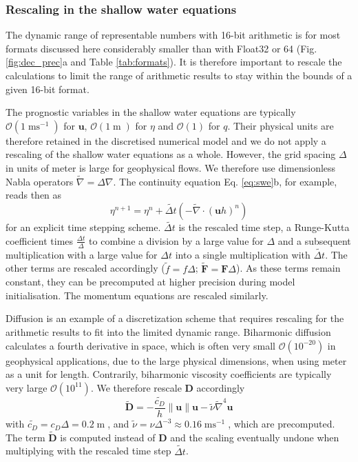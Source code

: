 \documentclass[draft]{agujournal2019}
\newcommand{\op}{\operatorname}
\begin{document}
\subsubsection{Rescaling in the shallow water equations}
\label{sec:swm_rescale}

The dynamic range of representable numbers with 16-bit arithmetic is for most
formats discussed here considerably smaller than with Float32 or 64
(Fig. \ref{fig:dec_prec}a and Table \ref{tab:formats}). It is therefore
important to rescale the calculations to limit the range of
arithmetic results to stay within the bounds of a given 16-bit format.

The prognostic variables in the shallow water equations are typically
$\mathcal{O}(1\op{ms}^{-1})$ for $\mathbf{u}$, $\mathcal{O}(1\op{m})$ for
$\eta$ and $\mathcal{O}(1)$ for $q$. Their physical units are therefore retained
in the discretised numerical model and we do not apply a rescaling of the shallow
water equations as a whole. However, the grid spacing $\Delta$ in units of meter
is large for geophysical flows. We therefore use dimensionless Nabla operators
$\tilde{\nabla} = \Delta\nabla$. The continuity equation Eq. \ref{eq:swe}b,
for example, reads then as
\begin{equation}
\eta^{n+1} = \eta^n + \tilde{\Delta t}\left( - \tilde{\nabla} \cdot (\mathbf{u}h)^n\right)
\label{eq:discr}
\end{equation}
for an explicit time stepping scheme. $\tilde{\Delta t}$ is the rescaled time
step, a Runge-Kutta coefficient times $\tfrac{\Delta t}{\Delta}$ to combine a
division by a large value for $\Delta$ and a subsequent multiplication with a
large value for $\Delta t$ into a single multiplication with $\tilde{\Delta t}$.
The other terms are rescaled accordingly ($\tilde{f} = f\Delta$;
$\tilde{\mathbf{F}} = \mathbf{F}\Delta$). As these terms remain constant, they
can be precomputed at higher precision during model initialisation.
The momentum equations are rescaled similarly.

Diffusion is an example of a discretization scheme that requires rescaling for
the arithmetic results to fit into the limited dynamic range. Biharmonic diffusion
\cite{Griffies2000} calculates a fourth derivative in space,
which is often very small $\mathcal{O}(10^{-20})$ in geophysical applications,
due to the large physical dimensions, when using meter as a unit for length.
Contrarily, biharmonic viscosity coefficients are typically very large
$\mathcal{O}(10^{11})$.
We therefore rescale $\mathbf{D}$ accordingly
\begin{equation}
\tilde{\mathbf{D}} =-\frac{\tilde{c_D}}{h}\| \mathbf{u} \| \mathbf{u} -
\tilde{\nu}\tilde{\nabla}^4\mathbf{u}
\end{equation}
with $\tilde{c_D} = c_D\Delta = 0.2\op{m}$,  and $\tilde{\nu} = \nu\Delta^{-3}
\approx 0.16\op{ms}^{-1}$, which are precomputed. The term
$\tilde{\mathbf{D}}$ is computed instead of $\mathbf{D}$ and the scaling eventually
undone when multiplying with the rescaled time step $\tilde{\Delta t}$.
\end{document}
